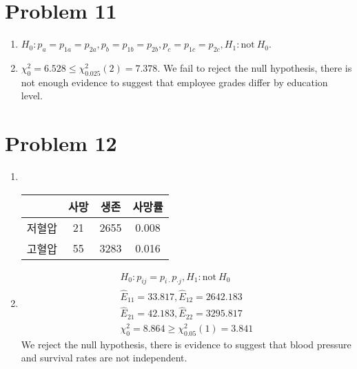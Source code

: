 \documentclass{article}
\begin{document}
\section*{Problem 11}

\begin{enumerate}
	\item $H_0: p_a = p_{1a} = p_{2a}, p_b = p_{1b} = p_{2b}, p_c = p_{1c} = p_{2c}, H_1: \textrm{not}~ H_0$.
	\item $\chi_0^2 = 6.528 \le \chi_{0.025}^2(2) = 7.378$.
		We fail to reject the null hypothesis, there is not enough
		evidence to suggest that employee grades differ by education
		level.
\end{enumerate}

\section*{Problem 12}

\begin{enumerate}
	\item ~
		\begin{center}
		\begin{tabular}{c|cc|c}
			& 사망 & 생존 & 사망률 \\
			\hline
			저혈압 & 21 & 2655 & 0.008 \\
			고혈압 & 55 & 3283 & 0.016
		\end{tabular}
		\end{center}
	\item
		\begin{gather*}
			H_0: p_{ij} = p_{i \cdot}p_{\cdot j}, H_1: \textrm{not}~ H_0 \\
			\widehat{E}_{11} = 33.817, \widehat{E}_{12} = 2642.183 \\
			\widehat{E}_{21} = 42.183, \widehat{E}_{22} = 3295.817 \\
			\chi_0^2 = 8.864 \ge \chi_{0.05}^2(1) = 3.841
		\end{gather*}
		We reject the null hypothesis, there is evidence to suggest
		that blood pressure and survival rates are not independent.
\end{enumerate}
\end{document}
